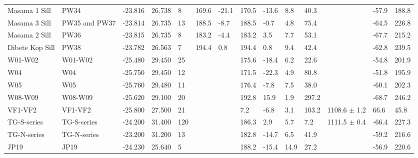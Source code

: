 \documentclass[11pt,letterpaper]{article}
\begin{document}
\begin{table}[!ht]
\begin{adjustwidth}{-0.0in}{0in}
\begin{tiny}
\begin{tabular}{p{2.0 cm}p{1.25 cm}llllllllllll}
Masama 1 Sill            &                             PW34 &   -23.816 &     26.738 &    8 &  169.6 & -21.1 &   170.5 &   -13.6 &   8.8 &   40.3 &      &     -57.9 &      188.8 \\
Masama 3 Sill            &                 PW35 and PW37 &   -23.814 &     26.735 &   13 &  188.5 &  -8.7 &   188.5 &    -0.7 &   4.8 &   75.4 &      &     -64.5 &      226.8 \\
Masama 2 Sill            &                             PW36 &   -23.815 &     26.735 &    8 &  183.2 &  -4.4 &   183.2 &     3.5 &   7.7 &   53.1 &      &     -67.7 &      215.2 \\
Dibete Kop Sill          &                             PW38 &   -23.782 &     26.563 &    7 &  194.4 &   0.8 &   194.4 &     0.8 &   9.4 &   42.4 &      &     -62.8 &      239.5 \\
W01-W02                  &                              W01-W02 &   -25.480 &     29.450 &   25 &     &    &   175.6 &   -18.4 &   6.2 &   22.6 &      &     -54.8 &      201.9 \\
W04                      &                                  W04 &   -25.750 &     29.450 &   12 &     &    &   171.5 &   -22.3 &   4.9 &   80.8 &      &     -51.8 &      195.9 \\
W05                      &                                  W05 &   -25.760 &     29.480 &   11 &     &    &   176.4 &    -7.8 &   7.5 &   38.0 &      &     -60.1 &      202.3 \\
W08-W09                  &                              W08-W09 &   -25.620 &     29.100 &   20 &     &    &   192.8 &    15.9 &   1.9 &  297.2 &      &     -68.7 &      246.2 \\
VF1-VF2                  &                              VF1-VF2 &   -25.800 &     27.500 &   21 &     &    &     7.2 &    -6.8 &   3.1 &  103.2 &  1108.6 $\pm$ 1.2 &      66.6 &       45.8 \\
TG-S-series              &                          TG-S-series &   -24.200 &     31.400 &  120 &     &    &   186.3 &     2.9 &   5.7 &    7.2 &  1111.5 $\pm$ 0.4 &     -66.4 &      227.3 \\
TG-N-series              &                          TG-N-series &   -23.200 &     31.200 &   13 &     &    &   182.8 &   -14.7 &   6.5 &   41.9 &      &     -59.2 &      216.6 \\
JP19                     &                                 JP19 &   -24.230 &     25.640 &    5 &     &    &   188.2 &   -15.4 &  14.9 &   27.2 &      &     -56.9 &      220.6 \\

\end{tabular}
\end{tiny}
\end{adjustwidth}
\end{table}
\end{document}

